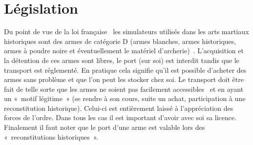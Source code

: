 \section{Législation}


Du point de vue de la loi française~\footnotemark{} les simulateurs utilisés dans les arts martiaux historiques sont des armes de catégorie D (armes blanches, armes historiques, armes à poudre noire et éventuellement le matériel d'archerie)~\cite[p.~249]{Morel:2008:ProtegorGuidePratique}.
L'acquisition et la détention de ces armes sont libres, le port (sur soi) est interdit tandis que le transport est réglementé.
En pratique cela signifie qu'il est possible d'acheter des armes sans problème et que l'on peut les stocker chez soi.
Le transport doit être fait de telle sorte que les armes ne soient pas facilement accessibles~\footnotemark{} et en ayant un « motif légitime » (se rendre à son cours, suite un achat, participation à une reconstitution historique).
Celui-ci est entièrement laissé à l'appréciation des forces de l'ordre.
Dans tous les cas il est important d'avoir avec soi sa licence.
Finalement il faut noter que le port d'une arme est valable lors des « reconstitutions historiques ».


